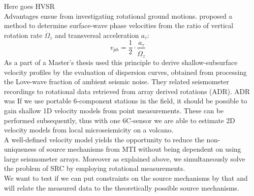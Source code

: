 \documentclass[12pt, a4paper]{article}
\begin{document}
Here goes HVSR\\

Advantages ensue from investigating rotational ground motions. \citet{Igel2005} proposed a method to determine surface-wave phase velocities from the ratio of vertical rotation rate $\dot{\Omega}_z$ and transversal acceleration $a_\tau$:
\begin{equation}
	v_{ph} = \frac{1}{2} \cdot \frac{a_\tau}{\dot{\Omega}_z}
\end{equation}
As a part of a Master's thesis \citet{Wietek2013} used this principle to derive shallow-subsurface velocity profiles by the evaluation of dispersion curves, obtained from processing the Love-wave fraction of ambient seismic noise. They related seismometer recordings to rotational data retrieved from array derived rotations (ADR). ADR was 
If we use portable 6-component stations in the field, it should be possible to gain shallow 1D velocity models from point measurements. These can be performed subsequently, thus with one 6C-sensor we are able to estimate 2D velocity models from local microseismicity on a volcano.\\

A well-defined velocity model yields the opportunity to reduce the non-uniqueness of source mechanisms from MTI without being dependent on using large seismometer arrays. Moreover as explained above, we simultaneously solve the problem of SRC by employing rotational measurements.\\
We want to test if we can put constraints on the source mechanisms by that and will relate the measured data to the theoretically possible source mechanisms.
\end{document}
